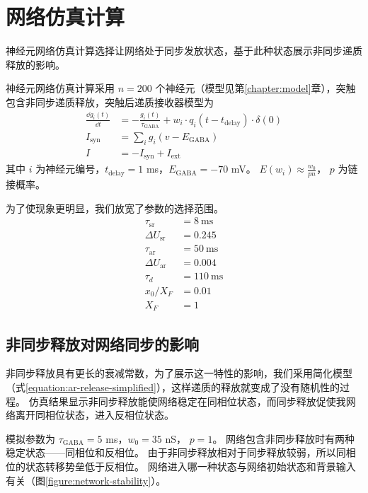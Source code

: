 \section{网络仿真计算}
\label{section:resutl:network}
神经元网络仿真计算选择让网络处于同步发放状态，基于此种状态展示非同步递质释放的影响。

神经元网络仿真计算采用 $n = 200$ 个神经元（模型见第\ref{chapter:model}章），突触包含非同步递质释放，突触后递质接收器模型为
\begin{align}
\label{equation:network-receptor-model}
\frac{\dd{g_i\left(t\right)}}{\dd{t}} &= - \frac{g_i\left(t\right)}{\tau_\text{GABA}} + w_i \cdot q_i\left(t - t_\text{delay}\right) \cdot \delta(0) \\
I_\text{syn} &= \sum_i g_i\left(v-E_\text{GABA}\right) \\
I &= - I_\text{syn} + I_\text{ext}
\end{align}
其中 $i$ 为神经元编号，$t_\text{delay} = 1$ ms，$E_\text{GABA} = -70$ mV。
$E(w_i) \approx \frac{w_0}{pn}$， $p$ 为链接概率。

为了使现象更明显，我们放宽了参数的选择范围。
\begin{align}
\label{equation:network-parameters}
\tau_\text{sr} &=  8 \ \text{ms} \\
\Delta U_\text{sr} &= 0.245 \\
\tau_\text{ar} &= 50 \ \text{ms} \\
\Delta U_\text{ar} &= 0.004 \\
\tau_d &= 110 \ \text{ms} \\
x_0/X_F &= 0.01 \\
X_F &= 1
\end{align}


\subsection{非同步释放对网络同步的影响}
\label{section:result:network-synchronization}
非同步释放具有更长的衰减常数，为了展示这一特性的影响，我们采用简化模型（式\ref{equation:ar-release-simplified}），这样递质的释放就变成了没有随机性的过程。
仿真结果显示非同步释放能使网络稳定在同相位状态，而同步释放促使我网络离开同相位状态，进入反相位状态。

模拟参数为 $\tau_\text{GABA} = 5$ ms，$w_0 = 35$ nS， $p = 1$。
网络包含非同步释放时有两种稳定状态——同相位和反相位。
由于非同步释放相对于同步释放较弱，所以同相位的状态转移势垒低于反相位。
网络进入哪一种状态与网络初始状态和背景输入有关（图\ref{figure:network-stability}）。

